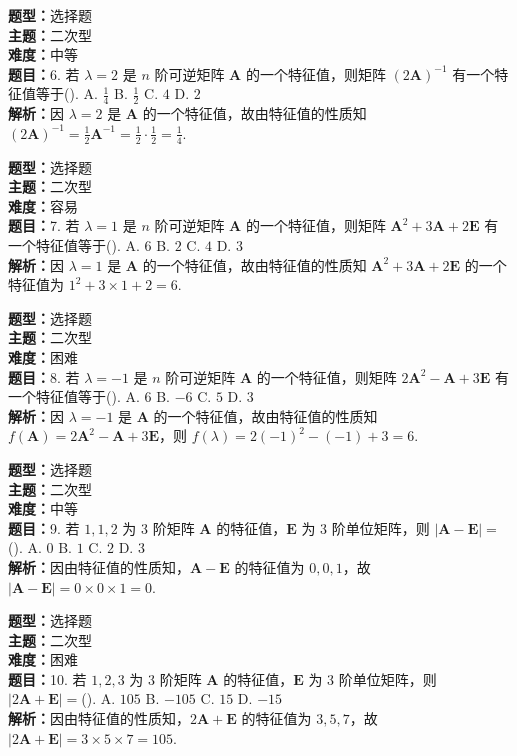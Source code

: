 \documentclass{ctexart}
\newenvironment{question}[5]{%
	\noindent\textbf{题型：}#1\\
	\textbf{主题：}#2\\
	\textbf{难度：}#3\\
	\textbf{题目：}#4\\
	\textbf{解析：}#5\\
	\vspace{1em}
}{}
\begin{document}
	\begin{question}
		{选择题}
		{二次型}
		{中等}
		{6. 若 \(\lambda=2\) 是 \(n\) 阶可逆矩阵 \(\mathbf{A}\) 的一个特征值，则矩阵 \((2 \mathbf{A})^{-1}\) 有一个特征值等于(\qquad). 
			A. \(\frac{1}{4}\)
			B. \(\frac{1}{2}\)
			C. \(4\)
			D. \(2\)}
		{因 \(\lambda=2\) 是 \(\mathbf{A}\) 的一个特征值，故由特征值的性质知 \((2 \mathbf{A})^{-1}=\frac{1}{2} \mathbf{A}^{-1}=\frac{1}{2} \cdot \frac{1}{2}=\frac{1}{4}\). }
	\end{question}
	
	\begin{question}
		{选择题}
		{二次型}
		{容易}
		{7. 若 \(\lambda=1\) 是 \(n\) 阶可逆矩阵 \(\mathbf{A}\) 的一个特征值，则矩阵 \(\mathbf{A}^2+3 \mathbf{A}+2 \mathbf{E}\) 有一个特征值等于(\qquad). 
			A. \(6\)
			B. \(2\)
			C. \(4\)
			D. \(3\)}
		{因 \(\lambda=1\) 是 \(\mathbf{A}\) 的一个特征值，故由特征值的性质知 \(\mathbf{A}^2+3 \mathbf{A}+2 \mathbf{E}\) 的一个特征值为 \(1^2+3×1+2=6\). }
	\end{question}
	
	\begin{question}
		{选择题}
		{二次型}
		{困难}
		{8. 若 \(\lambda=-1\) 是 \(n\) 阶可逆矩阵 \(\mathbf{A}\) 的一个特征值，则矩阵 \(2 \mathbf{A}^2-\mathbf{A}+3 \mathbf{E}\) 有一个特征值等于(\qquad). 
			A. \(6\)
			B. \(-6\)
			C. \(5\)
			D. \(3\)}
		{因 \(\lambda=-1\) 是 \(\mathbf{A}\) 的一个特征值，故由特征值的性质知 \(f(\mathbf{A})=2 \mathbf{A}^2-\mathbf{A}+3 \mathbf{E}\)，则 \(f(\lambda)=2(-1)^2-(-1)+3=6\). }
	\end{question}
	
	\begin{question}
		{选择题}
		{二次型}
		{中等}
		{9. 若 \(1,1,2\) 为 3 阶矩阵 \(\mathbf{A}\) 的特征值，\(\mathbf{E}\) 为 3 阶单位矩阵，则 \(|\mathbf{A}-\mathbf{E}|=\)(\qquad). 
			A. \(0\)
			B. \(1\)
			C. \(2\)
			D. \(3\)}
		{因由特征值的性质知，\(\mathbf{A}-\mathbf{E}\) 的特征值为 \(0,0,1\)，故 \(|\mathbf{A}-\mathbf{E}|=0×0×1=0\). }
	\end{question}
	
	\begin{question}
		{选择题}
		{二次型}
		{困难}
		{10. 若 \(1,2,3\) 为 3 阶矩阵 \(\mathbf{A}\) 的特征值，\(\mathbf{E}\) 为 3 阶单位矩阵，则 \(|2 \mathbf{A}+\mathbf{E}|=\)(\qquad). 
			A. \(105\)
			B. \(-105\)
			C. \(15\)
			D. \(-15\)}
		{因由特征值的性质知，\(2 \mathbf{A}+\mathbf{E}\) 的特征值为 \(3,5,7\)，故 \(|2 \mathbf{A}+\mathbf{E}|=3×5×7=105\). }
	\end{question}
	
\end{document}

